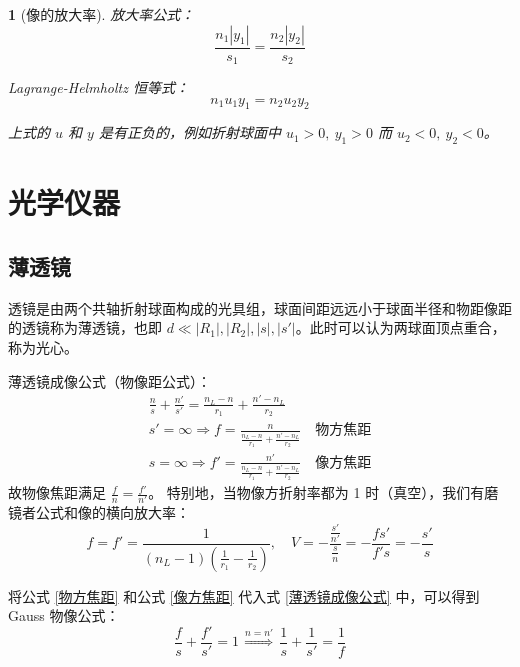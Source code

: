 \documentclass[UTF8]{report}
\theoremstyle{MyLineTheoremStyle} %
\theoremstyle{MyBlockTheoremStyle} %
\theoremstyle{MySubsubsectionStyle} %
\newtheorem{definition}{}
\begin{document}
\begin{definition}[像的放大率]
放大率公式：
\begin{equation}
\frac{n_1 | y_1 |}{s_1} = \frac{n_2 | y_2 |}{s_2}
\end{equation}

Lagrange-Helmholtz 恒等式：
\begin{equation}
n_1u_1y_1 = n_2u_2y_2
\end{equation}

上式的 $u$ 和 $y$ 是有正负的，例如折射球面中 $u_1 > 0,\ y_1 >0$ 而 $u_2 <0,\ y_2 < 0$。

\end{definition}





\section{光学仪器}


\subsection{薄透镜}

透镜是由两个共轴折射球面构成的光具组，球面间距远远小于球面半径和物距像距的透镜称为薄透镜，也即 $d \ll | R_1 |, | R_2 |, | s |, | s' |$。此时可以认为两球面顶点重合，称为光心。

薄透镜成像公式（物像距公式）：
\begin{gather} 
\frac{n}{s} + \frac{n'}{s'} = \frac{n_L - n}{r_1} + \frac{n' - n_L}{r_2} \label{薄透镜成像公式} \\
s' = \infty \Longrightarrow  f = \frac{n}{\frac{n_L - n}{r_1} + \frac{n' - n_L}{r_2}}\quad \text{物方焦距} \label{物方焦距} \\ 
s = \infty \Longrightarrow  f' = \frac{n'}{\frac{n_L - n}{r_1} + \frac{n' - n_L}{r_2}}\quad \text{像方焦距} \label{像方焦距}
\end{gather}
故物像焦距满足 $\frac{f}{n} = \frac{f'}{n'}$。
特别地，当物像方折射率都为 1 时（真空），我们有磨镜者公式和像的横向放大率：
\begin{equation}
f =f' = \frac{1}{(n_L - 1)(\frac{1}{r_1} - \frac{1}{r_2})},\quad  V = -\frac{\frac{s'}{n'}}{\frac{s}{n}} = -\frac{fs'}{f's} =  - \frac{s'}{s}
\end{equation}


将公式 \ref{物方焦距} 和公式 \ref{像方焦距} 代入式 \ref{薄透镜成像公式} 中，可以得到 Gauss 物像公式：
\begin{equation}
\frac{f}{s} + \frac{f'}{s'} = 1 \overset{n = n'}{\ \ \ \Longrightarrow\ \ \  } \frac{1}{s} + \frac{1}{s'} = \frac{1}{f}
\label{Gauss物像公式}
\end{equation}
\end{document}
